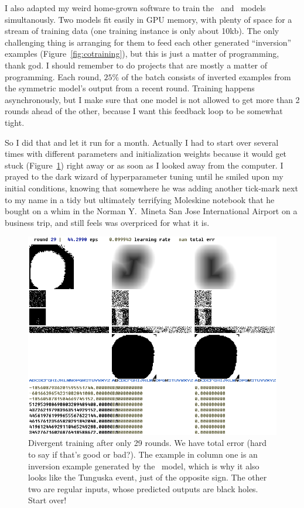 \documentclass[twocolumn]{article}
\begin{document}
I also adapted my weird home-grown software to train the
\makeuppercase\ and \makelowercase\ models simultanously. Two models
fit easily in GPU memory, with plenty of space for a stream of
training data (one training instance is only about 10kb). The only
challenging thing is arranging for them to feed each other generated
``inversion'' examples (Figure~\ref{fig:cotraining}), but this is just
a matter of programming, thank god. I should remember to do projects
that are mostly a matter of programming. Each round, $25\%$ of the
batch consists of inverted examples from the symmetric model's output
from a recent round. Training happens asynchronously, but I make sure
that one model is not allowed to get more than 2 rounds ahead of the
other, because I want this feedback loop to be somewhat tight.

So I did that and let it run for a month. Actually I had to start over
several times with different parameters and initialization weights
because it would get stuck (Figure~\ref{fig:nans}) right away or as
soon as I looked away from the computer. I prayed to the dark wizard
of hyperparameter tuning until he smiled upon my initial conditions,
knowing that somewhere he was adding another tick-mark next to my name
in a tidy but ultimately terrifying Moleskine notebook that he bought
on a whim in the Norman Y.~Mineta San Jose International Airport on a
business trip, and still feels was overpriced for what it is.

\begin{figure}[ht]
\centering
  \includegraphics[width=0.9 \linewidth]{nans}
\caption{ Divergent training after only 29 rounds. We have \nan{}
  total error (hard to say if that's good or bad?). The example in
  column one is an inversion example generated by the
  \makeuppercase\ model, which is why it also looks like the Tunguska
  event, just of the opposite sign. The other two are regular inputs,
  whose predicted outputs are black holes. Start over!
} \label{fig:nans}
\end{figure}
\end{document}
